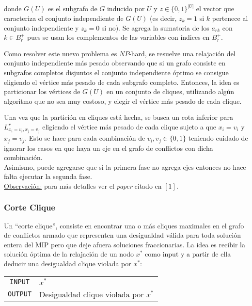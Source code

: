 donde $G(U)$ es el subgrafo de $G$ inducido por $U$ y $z\in \{0,1\}^{|U|}$ el vector que caracteriza el conjunto independiente de $G(U)$ (es decir, $z_k = 1$ si $k$ pertenece al conjunto independiente y $z_k = 0$ si no). Se agrega la sumatoria de los $a_{rk}$ con $k\in B^+_r$ pues se usan los complementos de las variables con \'indices en $B^+_r$. 

Como resolver este nuevo problema es $NP$-hard, se resuelve una relajaci\'on del conjunto independiente m\'as pesado observando que si un grafo consiste en subgrafos completos disjuntos el conjunto independiente \'optimo se consigue eligiendo el v\'ertice m\'as pesado de cada subgrafo completo. Entonces, la idea es particionar los v\'ertices de $G(U)$ en un conjunto de cliques, utilizando alg\'un algoritmo que no sea muy costoso, y elegir el v\'ertice m\'as pesado de cada clique.

Una vez que la partici\'on en cliques está hecha, se busca un cota inferior para $L^r_{x_i=v_i,x_j=v_j}$ eligiendo el v\'ertice m\'as pesado de cada clique sujeto a que $x_i = v_i$ y $x_j = v_j$. Esto se hace para cada combinaci\'on de $v_i,v_j\in \{0,1\}$ teniendo cuidado de ignorar los casos en que haya un eje en el grafo de conflictos con dicha combinaci\'on.\\

Asimismo, puede agregarse que si la primera fase no agrega ejes entonces no hace falta ejecutar la segunda fase.\\

{\footnotesize\underline{Observación:} para más detalles ver el \emph{paper} citado en $[1]$.}

\subsubsection*{Corte Clique}

Un ``corte clique'', consiste en encontrar una o m\'as cliques maximales en el grafo de conflictos armado que representen una desigualdad válida para toda solución entera del MIP pero que deje afuera soluciones fraccionarias. La idea es recibir la solución óptima de la relajación de un nodo $x^*$ como input y a partir de ella deducir una desigualdad clique violada por $x^*$:\\

{
\centering
\begin{tabular}{c l}
\verb_INPUT_ & $x^*$\\
\verb_OUTPUT_ & Desigualdad clique violada por $x^*$\\
\end{tabular}\\
\vspace{5mm}
}

